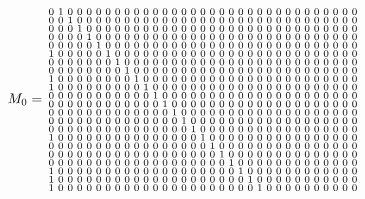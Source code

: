 \documentclass[letterpaper,twocolumn,10pt]{article}
\begin{document}
\begin{figure*}
\begin{align*}
M_0 &=
\setcounter{MaxMatrixCols}{33}
\begin{smallmatrix}
0&1&0&0&0&0&0&0&0&0&0&0&0&0&0&0&0&0&0&0&0&0&0&0&0&0&0&0&0&0&0&0&0 \\
0&0&1&0&0&0&0&0&0&0&0&0&0&0&0&0&0&0&0&0&0&0&0&0&0&0&0&0&0&0&0&0&0 \\
0&0&0&1&0&0&0&0&0&0&0&0&0&0&0&0&0&0&0&0&0&0&0&0&0&0&0&0&0&0&0&0&0 \\
0&0&0&0&1&0&0&0&0&0&0&0&0&0&0&0&0&0&0&0&0&0&0&0&0&0&0&0&0&0&0&0&0 \\
0&0&0&0&0&1&0&0&0&0&0&0&0&0&0&0&0&0&0&0&0&0&0&0&0&0&0&0&0&0&0&0&0 \\
1&0&0&0&0&0&1&0&0&0&0&0&0&0&0&0&0&0&0&0&0&0&0&0&0&0&0&0&0&0&0&0&0 \\
0&0&0&0&0&0&0&1&0&0&0&0&0&0&0&0&0&0&0&0&0&0&0&0&0&0&0&0&0&0&0&0&0 \\
0&0&0&0&0&0&0&0&1&0&0&0&0&0&0&0&0&0&0&0&0&0&0&0&0&0&0&0&0&0&0&0&0 \\
1&0&0&0&0&0&0&0&0&1&0&0&0&0&0&0&0&0&0&0&0&0&0&0&0&0&0&0&0&0&0&0&0 \\
1&0&0&0&0&0&0&0&0&0&1&0&0&0&0&0&0&0&0&0&0&0&0&0&0&0&0&0&0&0&0&0&0 \\
0&0&0&0&0&0&0&0&0&0&0&1&0&0&0&0&0&0&0&0&0&0&0&0&0&0&0&0&0&0&0&0&0 \\
0&0&0&0&0&0&0&0&0&0&0&0&1&0&0&0&0&0&0&0&0&0&0&0&0&0&0&0&0&0&0&0&0 \\
0&0&0&0&0&0&0&0&0&0&0&0&0&1&0&0&0&0&0&0&0&0&0&0&0&0&0&0&0&0&0&0&0 \\
0&0&0&0&0&0&0&0&0&0&0&0&0&0&1&0&0&0&0&0&0&0&0&0&0&0&0&0&0&0&0&0&0 \\
0&0&0&0&0&0&0&0&0&0&0&0&0&0&0&1&0&0&0&0&0&0&0&0&0&0&0&0&0&0&0&0&0 \\
1&0&0&0&0&0&0&0&0&0&0&0&0&0&0&0&1&0&0&0&0&0&0&0&0&0&0&0&0&0&0&0&0 \\
0&0&0&0&0&0&0&0&0&0&0&0&0&0&0&0&0&1&0&0&0&0&0&0&0&0&0&0&0&0&0&0&0 \\
0&0&0&0&0&0&0&0&0&0&0&0&0&0&0&0&0&0&1&0&0&0&0&0&0&0&0&0&0&0&0&0&0 \\
0&0&0&0&0&0&0&0&0&0&0&0&0&0&0&0&0&0&0&1&0&0&0&0&0&0&0&0&0&0&0&0&0 \\
1&0&0&0&0&0&0&0&0&0&0&0&0&0&0&0&0&0&0&0&1&0&0&0&0&0&0&0&0&0&0&0&0 \\
1&0&0&0&0&0&0&0&0&0&0&0&0&0&0&0&0&0&0&0&0&1&0&0&0&0&0&0&0&0&0&0&0 \\
1&0&0&0&0&0&0&0&0&0&0&0&0&0&0&0&0&0&0&0&0&0&1&0&0&0&0&0&0&0&0&0&0 \\

\end{smallmatrix}
\end{align*}
\end{figure*}
\end{document}
